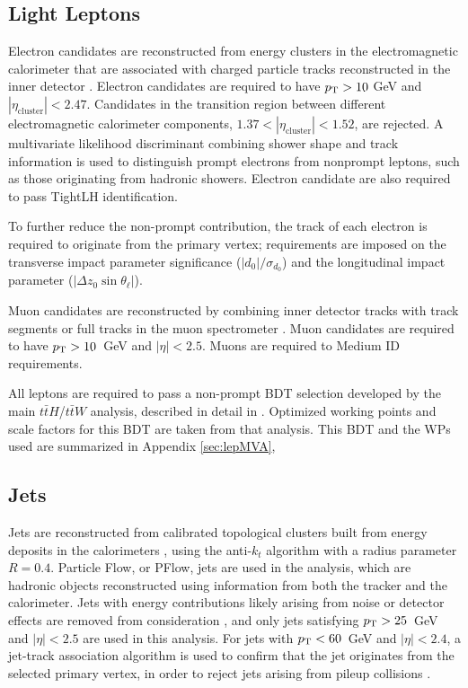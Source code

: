 \subsection{Light Leptons}
\label{subsec:lepSelection}

Electron candidates are reconstructed from energy clusters in the electromagnetic calorimeter that are associated with charged particle tracks reconstructed in the inner detector \cite{ATLAS-CONF-2016-024}.  Electron candidates are required to have $p_{\text{T}} > 10$ GeV and $|\eta_\textrm{cluster}| < 2.47$. Candidates in the transition region between different electromagnetic calorimeter components, $1.37 < |\eta_\textrm{cluster}| < 1.52$, are rejected. A multivariate likelihood discriminant combining shower shape and track information is used to distinguish prompt electrons from nonprompt leptons, such as those originating from hadronic showers. Electron candidate are also required to pass TightLH identification.

To further reduce the non-prompt contribution, the track of each electron is required to originate from the primary vertex; requirements are imposed on the transverse impact parameter significance ($|d_0|/\sigma_{d_0}$) and the longitudinal impact parameter ($|\Delta z_0 \sin \theta_\ell|$).

Muon candidates are reconstructed by combining inner detector tracks with track segments or full tracks in the muon spectrometer \cite{PERF-2014-05}. Muon candidates are required to have $p_{\text{T}} > 10$~GeV and $|\eta| < 2.5$. Muons are required to Medium ID requirements.

All leptons are required to pass a non-prompt BDT selection developed by the main $t\bar{t}H$/$t\bar{t}W$ analysis, described in detail in \cite{ttH_paper}. Optimized working points and scale factors for this BDT are taken from that analysis. This BDT and the WPs used are summarized in Appendix \ref{sec:lepMVA},

\subsection{Jets}
\label{subsec:jetSelection}

Jets are reconstructed from calibrated topological clusters built from energy deposits in the calorimeters \cite{ATL-PHYS-PUB-2015-015}, using the anti-$k_t$ algorithm with a radius parameter $R=0.4$. Particle Flow, or PFlow, jets are used in the analysis, which are hadronic objects reconstructed using information from both the tracker and the calorimeter. Jets with energy contributions likely arising from noise or detector effects are removed from consideration \cite{ATLAS-CONF-2015-029}, and only jets satisfying $p_{\text{T}} > 25$~GeV and $|\eta| < 2.5$ are used in this analysis.  For jets with $p_{\text{T}} < 60$~GeV and $|\eta| < 2.4$, a jet-track association algorithm is used to confirm that the jet originates from the selected primary vertex, in order to reject jets arising from pileup collisions \cite{PERF-2014-03}. 



